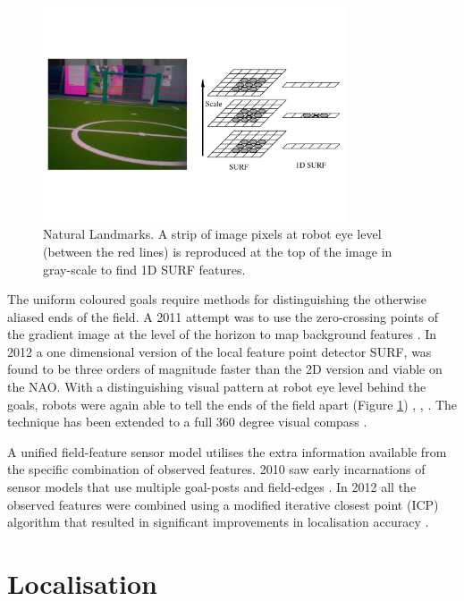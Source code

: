 \documentclass[runningheads,a4paper]{llncs}
\begin{document}
\begin{figure} [h]
\centering
\includegraphics[width=0.8\textwidth]{Figures/figSURF1D}
\caption{Natural Landmarks. A strip of image pixels at robot eye level (between the red lines) is reproduced at the top of the image in gray-scale to find 1D SURF features.} 
\label{figSURF1D}
\end{figure}

The uniform coloured goals require methods for distinguishing the otherwise aliased ends of the field. A 2011 attempt was to use the zero-crossing points of the gradient image at the level of the horizon to map background features \cite{deng2011natural}. In 2012 a one dimensional version of the local feature point detector SURF, was found to be three orders of magnitude faster than the 2D version and viable on the NAO. With a distinguishing visual pattern at robot eye level behind the goals, robots were again able to tell the ends of the field apart (Figure \ref{figSURF1D}) \cite{anderson2012robot}, \cite{anderson2012improvingperception}, \cite{anderson2012naturallandmark}. The technique has been extended to a full 360 degree visual compass \cite{anderson2014fast}. 



A unified field-feature sensor model utilises the extra information available from the specific combination of observed features. 2010 saw early incarnations of sensor models that use multiple goal-posts and field-edges \cite{cse10rUNSWift2010}. In 2012 all the observed features were combined using a modified iterative closest point (ICP) algorithm that resulted in significant improvements in localisation accuracy \cite{harris2012robocup} \cite{anderson2013icpsensormodel}.





\section{Localisation}
\end{document}
